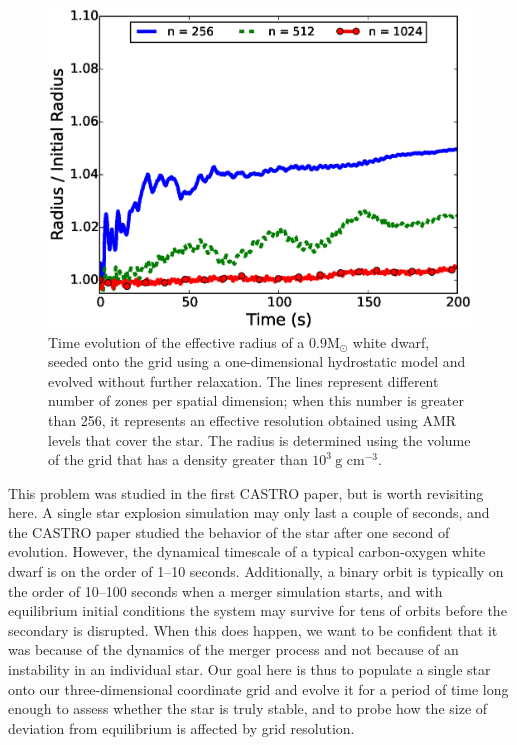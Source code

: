 \documentclass[iop]{../emulateapj}
\newcommand{\msolar}{\mathrm{M}_\odot}
\begin{document}
\begin{figure}
  \centering
  \includegraphics[scale=0.45]{plots/single_star_static_1e3_radius}
  \caption{Time evolution of the effective radius of a $0.9 \msolar$ 
    white dwarf, seeded onto the grid using a one-dimensional hydrostatic
    model and evolved without further relaxation. The lines represent 
    different number of zones per spatial dimension; when this number is 
    greater than 256, it represents an effective resolution obtained 
    using AMR levels that cover the star. The radius is determined 
    using the volume of the grid that has a density greater than $10^3\ \text{g cm}^{-3}.$
    \label{fig:single_star_static_radius}}
\end{figure}

This problem was studied in the first CASTRO paper, but is worth
revisiting here. A single star explosion simulation may only last a
couple of seconds, and the CASTRO paper studied the behavior of the
star after one second of evolution. However, the dynamical timescale
of a typical carbon-oxygen white dwarf is on the order of 1--10
seconds. Additionally, a binary orbit is typically on the order of
10--100 seconds when a merger simulation starts, and with equilibrium
initial conditions the system may survive for tens of orbits before
the secondary is disrupted. When this does happen, we want to be
confident that it was because of the dynamics of the merger process
and not because of an instability in an individual star. Our goal here
is thus to populate a single star onto our three-dimensional
coordinate grid and evolve it for a period of time long enough to
assess whether the star is truly stable, and to probe how the size of
deviation from equilibrium is affected by grid resolution.
\end{document}
